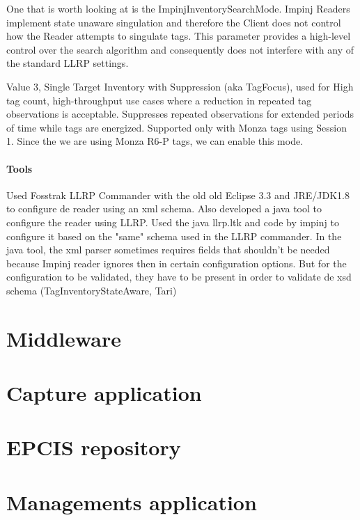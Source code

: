 One that is worth looking at is the ImpinjInventorySearchMode.
Impinj Readers implement state unaware singulation and therefore the Client does not control how the Reader attempts to singulate tags. This parameter provides a high-level control over the search algorithm and consequently does not interfere with any of the standard LLRP settings.~\cite[sec. 4.3.3]{ImpinjOctaneLLRP}

Value 3, Single Target Inventory with Suppression (aka TagFocus), used for High tag count, high-throughput use cases where a reduction in repeated tag observations is acceptable. Suppresses repeated observations for extended periods of time while tags are energized. Supported only with Monza tags using Session 1. Since the we are using Monza R6-P tags, we can enable this mode.

\paragraph{Tools}

Used Fosstrak LLRP Commander with the old old Eclipse 3.3 and JRE/JDK1.8 to configure de reader using an xml schema.
Also developed a java tool to configure the reader using LLRP. Used the java llrp.ltk and code by impinj to configure it based on the "same" schema used in the LLRP commander.
In the java tool, the xml parser sometimes requires fields that shouldn't be needed because Impinj reader ignores then in certain configuration options. But for the configuration to be validated, they have to be present in order to validate de xsd schema (TagInventoryStateAware, Tari)

\section{Middleware}

\section{Capture application}

\section{EPCIS repository}

\section{Managements application}
